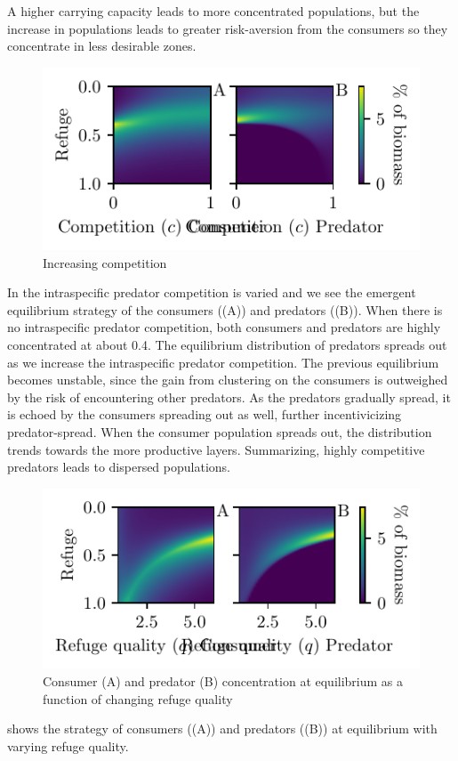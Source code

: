 A higher carrying capacity leads to more concentrated populations, but the increase in populations leads to greater risk-aversion from the consumers so they concentrate in less desirable zones.

\begin{figure}[H]
  \caption{Increasing competition}
  \label{fig:strat_comp}
    \includegraphics{plots/increasing_competition_c.pdf}
\end{figure}
In  the intraspecific predator competition is varied and we see the emergent  equilibrium strategy of the consumers ((A)) and predators ((B)). When there is no intraspecific predator competition, both consumers and predators are highly concentrated at about 0.4. The equilibrium distribution of predators spreads out as we increase the intraspecific predator competition. The previous equilibrium becomes unstable, since the gain from clustering on the consumers is outweighed by the risk of encountering other predators. As the predators gradually spread, it is echoed by the consumers spreading out as well, further incentivicizing predator-spread. When the consumer population spreads out,  the distribution trends towards the more productive layers. Summarizing, highly competitive predators leads to dispersed populations.

\begin{figure}[H]
  \caption{Consumer (A) and predator (B) concentration at equilibrium as a function of changing refuge quality}
  \label{fig:ref_qual}

    \includegraphics{plots/increasing_refuge_quality_c.pdf}
\end{figure}
 shows the strategy of consumers ((A)) and predators ((B)) at equilibrium with varying refuge quality.
